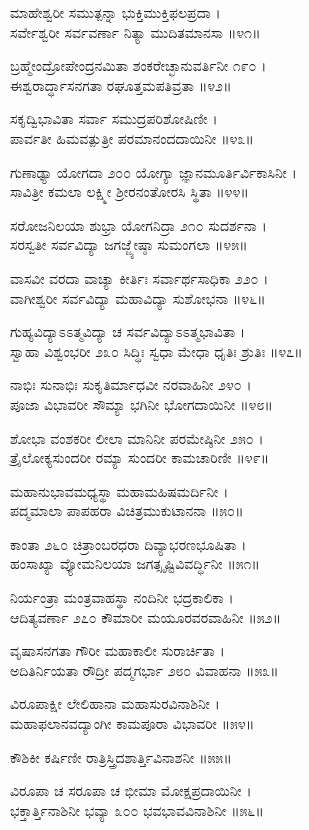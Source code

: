 ಮಾಹೇಶ್ವರೀ ಸಮುತ್ಪನ್ನಾ ಭುಕ್ತಿಮುಕ್ತಿಫಲಪ್ರದಾ ।\\
ಸರ್ವೇಶ್ವರೀ ಸರ್ವವರ್ಣಾ ನಿತ್ಯಾ ಮುದಿತಮಾನಸಾ ॥೪೧॥

ಬ್ರಹ್ಮೇಂದ್ರೋಪೇಂದ್ರನಮಿತಾ ಶಂಕರೇಚ್ಛಾನುವರ್ತಿನೀ ೧೯೦ ।\\
ಈಶ್ವರಾರ್ದ್ಧಾಸನಗತಾ ರಘೂತ್ತಮಪತಿವ್ರತಾ ॥೪೨॥

ಸಕೃದ್ವಿಭಾವಿತಾ ಸರ್ವಾ ಸಮುದ್ರಪರಿಶೋಷಿಣೀ ।\\
ಪಾರ್ವತೀ ಹಿಮವತ್ಪುತ್ರೀ ಪರಮಾನಂದದಾಯಿನೀ ॥೪೩॥

ಗುಣಾಢ್ಯಾ ಯೋಗದಾ ೨೦೦ ಯೋಗ್ಯಾ ಜ್ಞಾನಮೂರ್ತಿರ್ವಿಕಾಸಿನೀ ।\\
ಸಾವಿತ್ರೀ ಕಮಲಾ ಲಕ್ಷ್ಮೀ ಶ್ರೀರನಂತೋರಸಿ ಸ್ಥಿತಾ ॥೪೪॥

ಸರೋಜನಿಲಯಾ ಶುಭ್ರಾ ಯೋಗನಿದ್ರಾ ೨೧೦ ಸುದರ್ಶನಾ ।\\
ಸರಸ್ವತೀ ಸರ್ವವಿದ್ಯಾ ಜಗಜ್ಜ್ಯೇಷ್ಠಾ ಸುಮಂಗಲಾ ॥೪೫॥

ವಾಸವೀ ವರದಾ ವಾಚ್ಯಾ ಕೀರ್ತಿಃ ಸರ್ವಾರ್ಥಸಾಧಿಕಾ ೨೨೦ ।\\
ವಾಗೀಶ್ವರೀ ಸರ್ವವಿದ್ಯಾ ಮಹಾವಿದ್ಯಾ ಸುಶೋಭನಾ ॥೪೬॥

ಗುಹ್ಯವಿದ್ಯಾಽಽತ್ಮವಿದ್ಯಾ ಚ ಸರ್ವವಿದ್ಯಾಽಽತ್ಮಭಾವಿತಾ ।\\
ಸ್ವಾಹಾ ವಿಶ್ವಂಭರೀ ೨೩೦ ಸಿದ್ಧಿಃ ಸ್ವಧಾ ಮೇಧಾ ಧೃತಿಃ ಶ್ರುತಿಃ ॥೪೭॥

ನಾಭಿಃ ಸುನಾಭಿಃ ಸುಕೃತಿರ್ಮಾಧವೀ ನರವಾಹಿನೀ ೨೪೦ ।\\
ಪೂಜಾ ವಿಭಾವರೀ ಸೌಮ್ಯಾ ಭಗಿನೀ ಭೋಗದಾಯಿನೀ ॥೪೮॥

ಶೋಭಾ ವಂಶಕರೀ ಲೀಲಾ ಮಾನಿನೀ ಪರಮೇಷ್ಠಿನೀ ೨೫೦ ।\\
ತ್ರೈಲೋಕ್ಯಸುಂದರೀ ರಮ್ಯಾ ಸುಂದರೀ ಕಾಮಚಾರಿಣೀ ॥೪೯॥

ಮಹಾನುಭಾವಮಧ್ಯಸ್ಥಾ ಮಹಾಮಹಿಷಮರ್ದಿನೀ ।\\
ಪದ್ಮಮಾಲಾ ಪಾಪಹರಾ ವಿಚಿತ್ರಮುಕುಟಾನನಾ ॥೫೦॥

ಕಾಂತಾ ೨೬೦ ಚಿತ್ರಾಂಬರಧರಾ ದಿವ್ಯಾಭರಣಭೂಷಿತಾ ।\\
ಹಂಸಾಖ್ಯಾ ವ್ಯೋಮನಿಲಯಾ ಜಗತ್ಸೃಷ್ಟಿವಿವರ್ದ್ಧಿನೀ ॥೫೧॥

ನಿರ್ಯಂತ್ರಾ ಮಂತ್ರವಾಹಸ್ಥಾ ನಂದಿನೀ ಭದ್ರಕಾಲಿಕಾ ।\\
ಆದಿತ್ಯವರ್ಣಾ ೨೭೦ ಕೌಮಾರೀ ಮಯೂರವರವಾಹಿನೀ ॥೫೨॥

ವೃಷಾಸನಗತಾ ಗೌರೀ ಮಹಾಕಾಲೀ ಸುರಾರ್ಚಿತಾ ।\\
ಅದಿತಿರ್ನಿಯತಾ ರೌದ್ರೀ ಪದ್ಮಗರ್ಭಾ ೨೮೦ ವಿವಾಹನಾ ॥೫೩॥

ವಿರೂಪಾಕ್ಷೀ ಲೇಲಿಹಾನಾ ಮಹಾಸುರವಿನಾಶಿನೀ ।\\
ಮಹಾಫಲಾನವದ್ಯಾಂಗೀ ಕಾಮಪೂರಾ ವಿಭಾವರೀ ॥೫೪॥

ಕೌಶಿಕೀ ಕರ್ಷಿಣೀ ರಾತ್ರಿಸ್ತ್ರಿದಶಾರ್ತ್ತಿವಿನಾಶನೀ ॥೫೫॥

ವಿರೂಪಾ ಚ ಸರೂಪಾ ಚ ಭೀಮಾ ಮೋಕ್ಷಪ್ರದಾಯಿನೀ ।\\
ಭಕ್ತಾರ್ತ್ತಿನಾಶಿನೀ ಭವ್ಯಾ ೩೦೦ ಭವಭಾವವಿನಾಶಿನೀ ॥೫೬॥

